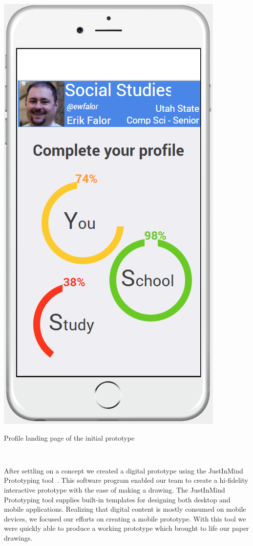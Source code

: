 \documentclass{sigchi-ext}
\begin{document}
\begin{marginfigure}[0pc]
	\begin{minipage}{\marginparwidth}
		\centering
		\includegraphics[width=0.9\columnwidth]{figures/prototype1.png}
		\caption{Profile landing page of the initial prototype}~\label{fig:prototype}
	\end{minipage}
\end{marginfigure}


After settling on a concept we created a digital prototype using the JustInMind Prototyping
tool~\cite{justinmind}. This software program enabled our team to create a hi-fidelity interactive
prototype with the ease of making a drawing. The JustInMind Prototyping tool supplies built-in
templates for designing both desktop and mobile applications. Realizing that digital content is
mostly consumed on mobile devices, we focused our efforts on creating a mobile prototype. With this
tool we were quickly able to produce a working prototype which brought to life our paper drawings.
\end{document}
